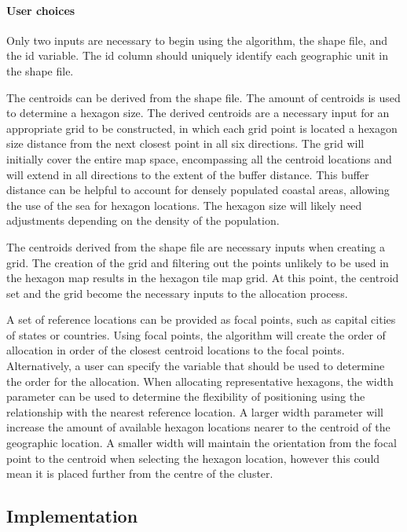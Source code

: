 \hypertarget{user-choices}{%
\paragraph{User choices}\label{user-choices}}

Only two inputs are necessary to begin using the algorithm, the shape
file, and the id variable. The id column should uniquely identify each
geographic unit in the shape file.

The centroids can be derived from the shape file. The amount of
centroids is used to determine a hexagon size. The derived centroids are
a necessary input for an appropriate grid to be constructed, in which
each grid point is located a hexagon size distance from the next closest
point in all six directions. The grid will initially cover the entire
map space, encompassing all the centroid locations and will extend in
all directions to the extent of the buffer distance. This buffer
distance can be helpful to account for densely populated coastal areas,
allowing the use of the sea for hexagon locations. The hexagon size will
likely need adjustments depending on the density of the population.

The centroids derived from the shape file are necessary inputs when
creating a grid. The creation of the grid and filtering out the points
unlikely to be used in the hexagon map results in the hexagon tile map
grid. At this point, the centroid set and the grid become the necessary
inputs to the allocation process.

A set of reference locations can be provided as focal points, such as
capital cities of states or countries. Using focal points, the algorithm
will create the order of allocation in order of the closest centroid
locations to the focal points. Alternatively, a user can specify the
variable that should be used to determine the order for the allocation.
When allocating representative hexagons, the width parameter can be used
to determine the flexibility of positioning using the relationship with
the nearest reference location. A larger width parameter will increase
the amount of available hexagon locations nearer to the centroid of the
geographic location. A smaller width will maintain the orientation from
the focal point to the centroid when selecting the hexagon location,
however this could mean it is placed further from the centre of the
cluster.

\hypertarget{implementation}{%
\subsection{Implementation}\label{implementation}}

